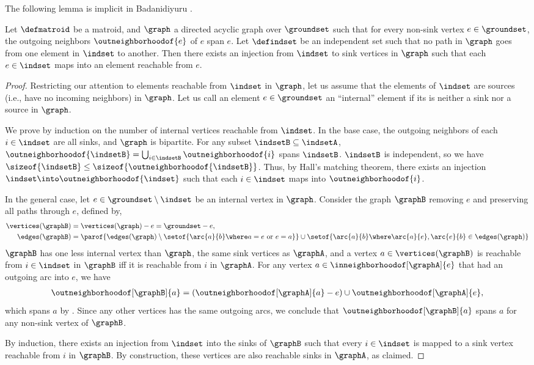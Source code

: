 \documentclass[oneside,letterpaper]{scrartcl} \usepackage{macros}
\begin{document}
The following lemma is implicit in Badanidiyuru \cite{abv-11}.
\begin{lemma}
  Let $\defmatroid$ be a matroid, and $\graph$ a directed acyclic
  graph over $\groundset$ such that for every non-sink vertex $e \in
  \groundset$, the outgoing neighbors $\outneighborhoodof{e}$ of $e$
  {span} $e$. Let $\defindset$ be an independent set such that no path
  in $\graph$ goes from one element in $\indset$ to another. Then
  there exists an injection from $\indset$ to sink vertices in
  $\graph$ such that each $e \in \indset$ maps into an element
  reachable from $e$.
\end{lemma}
\begin{proof}
  Restricting our attention to elements reachable from $\indset$ in
  $\graph$, let us assume that the elements of $\indset$ are sources
  (i.e., have no incoming neighbors) in $\graph$. Let us call an
  element $e \in \groundset$ an ``internal'' element if its is neither
  a sink nor a source in $\graph$.

  We prove by induction on the number of internal vertices reachable
  from $\indset$. In the base case, the outgoing neighbors of each $i
  \in \indset$ are all sinks, and $\graph$ is bipartite. For any
  subset $\indsetB \subseteq \indsetA$, $\outneighborhoodof{\indsetB}
  = \bigcup_{i \in \indsetB} \outneighborhoodof{i}$ spans $\indsetB$.
  $\indsetB$ is independent, so we have $\sizeof{\indsetB} \leq
  \sizeof{\outneighborhoodof{\indsetB}}$. Thus, by Hall's matching
  theorem, there exists an injection $\indset \into
  \outneighborhoodof{\indset}$ such that each $i \in \indset$ maps
  into $\outneighborhoodof{i}$.

  In the general case, let $e \in \groundset \setminus \indset$ be an
  internal vertex in $\graph$. Consider the graph $\graphB$ removing
  $e$ and preserving all paths through $e$, defined by,
  \begin{align*}
    \vertices(\graphB) &= \vertices(\graph) - e = \groundset - e,\\
    \edges(\graphB) &= \parof{\edges (\graph) \setminus \setof{\arc{a}{b} \where a = e \text{ or } e = a}} \cup \setof{\arc{a}{b} \where \arc{a}{e}, \arc{e}{b} \in
      \edges(\graph)}
  \end{align*}
  $\graphB$ has one less internal vertex than $\graph$, the same sink
  vertices as $\graphA$, and a vertex $a \in \vertices(\graphB)$ is
  reachable from $i \in \indset$ in $\graphB$ iff it is reachable from
  $i$ in $\graphA$. For any vertex $a \in
  \inneighborhoodof[\graphA]{e}$ that had an outgoing arc into $e$, we
  have
  \begin{align*}
    \outneighborhoodof[\graphB]{a} = (\outneighborhoodof[\graphA]{a} -
    e) \cup \outneighborhoodof[\graphA]{e},
  \end{align*}
  which spans $a$ by . Since any other
  vertices has the same outgoing arcs, we conclude that
  $\outneighborhoodof[\graphB]{a}$ spans $a$ for any non-sink vertex
  of $\graphB$.

  By induction, there exists an injection from $\indset$ into the
  sinks of $\graphB$ such that every $i \in \indset$ is mapped to a
  sink vertex reachable from $i$ in $\graphB$. By construction, these
  vertices are also reachable sinks in $\graphA$, as claimed.
\end{proof}
\end{document}
